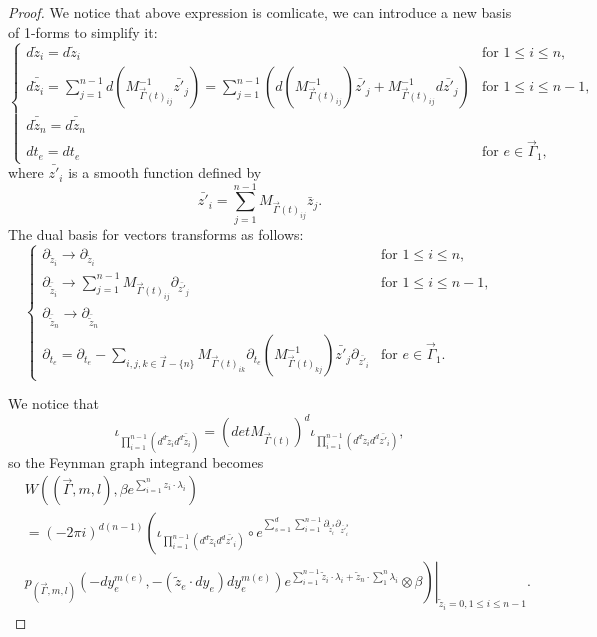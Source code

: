 \documentclass[11pt]{amsart}
\theoremstyle{definition}
\theoremstyle{remark}
\numberwithin{equation}{section}
\begin{document}
\begin{proof}
    We notice that above expression is comlicate, we can introduce a new basis of 1-forms to simplify it:
    $$
    \begin{cases}
        d\tilde{z}_{i}=d\tilde{z}_{i}&\text{for }1\leq i\leq n,\\
        d\bar{\tilde{z}}_{i}=\sum_{j=1}^{n-1}d\left(
        M^{-1}_{\vec{\Gamma}(t)_{ij}}\bar{z'}_{j}
        \right)=\sum_{j=1}^{n-1}\left(
        d(M^{-1}_{\vec{\Gamma}(t)_{ij}})\bar{z'}_{j}+M^{-1}_{\vec{\Gamma}(t)_{ij}}d\bar{z'}_{j}
        \right) &\text{for }1\leq i\leq n-1,\\
        d\bar{\tilde{z}}_{n}=d\bar{\tilde{z}}_{n}\\
        dt_{e}=dt_{e}&\text{for }e\in\vec{\Gamma}_{1},
    \end{cases}
    $$
    where $\bar{z'}_{i}$ is a smooth function defined by
    $$
    \bar{z'}_{i}=\sum_{j=1}^{n-1}M_{\vec{\Gamma}(t)_{ij}}\bar{z}_{j}.
    $$
    The dual basis for vectors transforms as follows:
    $$
    \begin{cases}
        \partial_{\tilde{z}_{i}}\rightarrow \partial_{\tilde{z}_{i}}&\text{for }1\leq i\leq n,\\
        \partial_{\bar{\tilde{z}}_{i}}\rightarrow \sum_{j=1}^{n-1}
        M_{\vec{\Gamma}(t)_{ij}}\partial_{\bar{z'}_{j}}
         &\text{for }1\leq i\leq n-1,\\
        \partial_{\bar{\tilde{z}}_{n}}\rightarrow \partial_{\bar{\tilde{z}}_{n}}\\
        \partial_{t_{e}}=\partial_{t_{e}}-\sum_{i,j,k\in \vec{I}-\{n\}}M_{\vec{\Gamma}(t)_{ik}}\partial_{t_{e}}(M^{-1}_{\vec{\Gamma}(t)_{kj}})\bar{z'}_{j}\partial_{\bar{z'}_{i}}&\text{for }e\in\vec{\Gamma}_{1}.
        
    \end{cases}
    $$

    We notice that
    $$
    \iota_{\prod_{i=1}^{n-1}(d^{d}\tilde{z}_{i}d^{d}\bar{\tilde{z}}_{i})}=(detM_{\vec{\Gamma}(t)})^{d}\iota_{\prod_{i=1}^{n-1}(d^{d}\tilde{z}_{i}d^{d}\bar{z'}_{i})},
    $$
    so the Feynman graph integrand becomes
    \begin{align*}
        &W((\vec{\Gamma},m,l),\beta e^{\sum_{i=1}^{n}z_{i}\cdot\lambda_{i}})\\
        &=(-2\pi i)^{d(n-1)}\left(
        \iota_{\prod_{i=1}^{n-1}(d^{d}\tilde{z}_{i}d^{d}\bar{z'}_{i})}
        \circ
        e^{\sum_{s=1}^{d}\sum_{i=1}^{n-1}\partial_{\tilde{z}_{i}^{s}}\partial_{\bar{z'}_{i}^{s}}}
        \right.\\
        &\left.\left.p_{(\vec{\Gamma},m,l)}(-dy_{e}^{m(e)},-(\tilde{z}_{e}\cdot dy_{e})dy_{e}^{m(e)})e^{\sum_{i=1}^{n-1}\tilde{z}_{i}\cdot\lambda_{i}+\tilde{z}_{n}\cdot\sum_{1}^{n}\lambda_{i}}\otimes \beta\right)\right|_{\tilde{z}_{i}=0,1\leq i\leq n-1}.
    \end{align*}


\end{proof}
\end{document}
